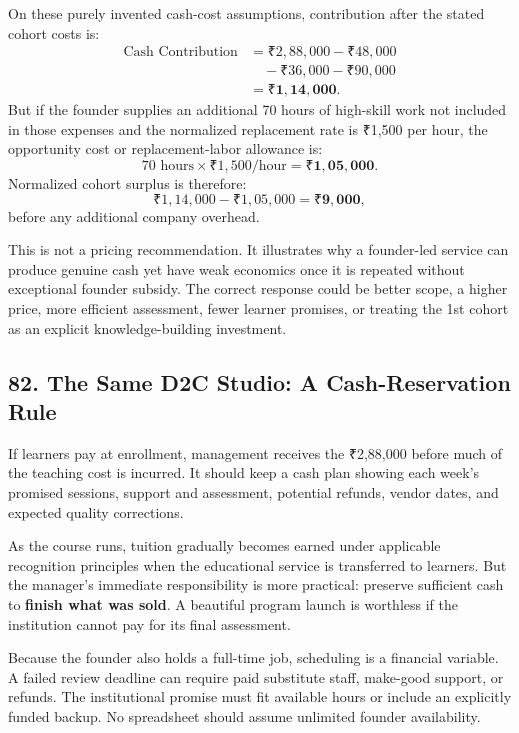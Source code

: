 On these purely invented cash-cost assumptions, contribution after the stated cohort costs is:
\begin{equation}
\begin{aligned}
\text{Cash Contribution} &= ₹2,88,000 - ₹48,000 \\
&\quad - ₹36,000 - ₹90,000 \\
&= \mathbf{₹1,14,000}.
\end{aligned}
\end{equation}
But if the founder supplies an additional 70 hours of high-skill work not included in those expenses and the normalized replacement rate is ₹1,500 per hour, the opportunity cost or replacement-labor allowance is:
\begin{equation}
70\text{ hours} \times ₹1,500/\text{hour} = \mathbf{₹1,05,000}.
\end{equation}
Normalized cohort surplus is therefore:
\begin{equation}
₹1,14,000 - ₹1,05,000 = \mathbf{₹9,000},
\end{equation}
before any additional company overhead.

This is not a pricing recommendation. It illustrates why a founder-led service can produce genuine cash yet have weak economics once it is repeated without exceptional founder subsidy. The correct response could be better scope, a higher price, more efficient assessment, fewer learner promises, or treating the 1st cohort as an explicit knowledge-building investment.

\subsection*{82. The Same D2C Studio: A Cash-Reservation Rule}

If learners pay at enrollment, management receives the ₹2,88,000 before much of the teaching cost is incurred. It should keep a cash plan showing each week's promised sessions, support and assessment, potential refunds, vendor dates, and expected quality corrections.

As the course runs, tuition gradually becomes earned under applicable recognition principles when the educational service is transferred to learners. But the manager's immediate responsibility is more practical: preserve sufficient cash to \textbf{finish what was sold}. A beautiful program launch is worthless if the institution cannot pay for its final assessment.

Because the founder also holds a full-time job, scheduling is a financial variable. A failed review deadline can require paid substitute staff, make-good support, or refunds. The institutional promise must fit available hours or include an explicitly funded backup. No spreadsheet should assume unlimited founder availability.

